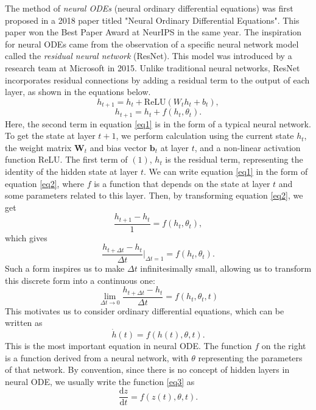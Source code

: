 \documentclass[a4paper,11pt, titlepage]{article}
\theoremstyle{definition}
\theoremstyle{plain}
\theoremstyle{remark}
\begin{document}
The method of \textit{neural ODEs} (neural ordinary differential equations) was first proposed in a 2018 paper titled "Neural Ordinary Differential Equations". This paper won the Best Paper Award at NeurIPS in the same year. The inspiration for neural ODEs came from the observation of a specific neural network model called the \textit{residual neural network} (ResNet). This model was introduced by a research team at Microsoft in 2015. Unlike traditional neural networks, ResNet incorporates residual connections by adding a residual term to the output of each layer, as shown in the equations below.
\begin{equation}\label{eq1}
    h_{t+1} = h_t + \mathrm{ReLU}\left(W_t h_t + b_t\right),\tag{1}
\end{equation}
\begin{equation}\label{eq2}
    h_{t+1} = h_t + f\left(h_t, \theta_t\right).\tag{2}
\end{equation}
Here, the second term in equation \ref{eq1} is in the form of a typical neural network. To get the state at layer $t+1$, we perform calculation using the current state $h_t$, the weight matrix $\textbf{W}_t$ and bias vector $\textbf{b}_t$  at layer $t$, and a non-linear activation function ReLU. The first term of $(1)$, $h_t$ is the residual term, representing the identity of the hidden state at layer $t$.
We can write equation \ref{eq1} in the form of equation \ref{eq2}, where $f$ is a function that depends on the state at layer $t$ and some parameters related to this layer. Then, by transforming equation \ref{eq2}, we get
$$\frac{h_{t+1} - h_t }{1}= f(h_t, \theta_t),$$
which gives
$$\frac{h_{t+\Delta t} - h_t }{\Delta t}\Bigg|_{\Delta t=1}= f(h_t, \theta_t).$$
Such a form inspires us to make $\Delta t$ infinitesimally small, allowing us to transform this discrete form into a continuous one:
$$\lim_{\Delta t\to 0}\frac{h_{t+\Delta t} - h_t }{\Delta t}= f(h_t, \theta_t,t)$$
This motivates us to consider ordinary differential equations, which can be written as
\begin{equation}\label{eq3}
    \dot{h}(t)= f(h(t), \theta,t).\tag{*}
\end{equation}
This is the most important equation in neural ODE. The function $f$ on the right is a function derived from a neural network, with $\theta$ representing the parameters of that network. By convention, since there is no concept of hidden layers in neural ODE, we usually write the function \ref{eq3} as
$$\frac{\mathrm{d}z}{\mathrm{d}t}= f(z(t), \theta,t).$$
\end{document}
